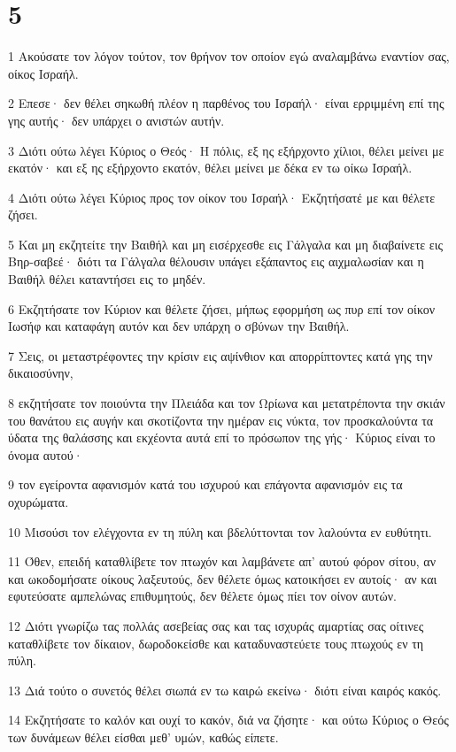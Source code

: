 \chapter{5}

\par 1 Ακούσατε τον λόγον τούτον, τον θρήνον τον οποίον εγώ αναλαμβάνω εναντίον σας, οίκος Ισραήλ.
\par 2 Επεσε· δεν θέλει σηκωθή πλέον η παρθένος του Ισραήλ· είναι ερριμμένη επί της γης αυτής· δεν υπάρχει ο ανιστών αυτήν.
\par 3 Διότι ούτω λέγει Κύριος ο Θεός· Η πόλις, εξ ης εξήρχοντο χίλιοι, θέλει μείνει με εκατόν· και εξ ης εξήρχοντο εκατόν, θέλει μείνει με δέκα εν τω οίκω Ισραήλ.
\par 4 Διότι ούτω λέγει Κύριος προς τον οίκον του Ισραήλ· Εκζητήσατέ με και θέλετε ζήσει.
\par 5 Και μη εκζητείτε την Βαιθήλ και μη εισέρχεσθε εις Γάλγαλα και μη διαβαίνετε εις Βηρ-σαβεέ· διότι τα Γάλγαλα θέλουσιν υπάγει εξάπαντος εις αιχμαλωσίαν και η Βαιθήλ θέλει καταντήσει εις το μηδέν.
\par 6 Εκζητήσατε τον Κύριον και θέλετε ζήσει, μήπως εφορμήση ως πυρ επί τον οίκον Ιωσήφ και καταφάγη αυτόν και δεν υπάρχη ο σβύνων την Βαιθήλ.
\par 7 Σεις, οι μεταστρέφοντες την κρίσιν εις αψίνθιον και απορρίπτοντες κατά γης την δικαιοσύνην,
\par 8 εκζητήσατε τον ποιούντα την Πλειάδα και τον Ωρίωνα και μετατρέποντα την σκιάν του θανάτου εις αυγήν και σκοτίζοντα την ημέραν εις νύκτα, τον προσκαλούντα τα ύδατα της θαλάσσης και εκχέοντα αυτά επί το πρόσωπον της γής· Κύριος είναι το όνομα αυτού·
\par 9 τον εγείροντα αφανισμόν κατά του ισχυρού και επάγοντα αφανισμόν εις τα οχυρώματα.
\par 10 Μισούσι τον ελέγχοντα εν τη πύλη και βδελύττονται τον λαλούντα εν ευθύτητι.
\par 11 Όθεν, επειδή καταθλίβετε τον πτωχόν και λαμβάνετε απ' αυτού φόρον σίτου, αν και ωκοδομήσατε οίκους λαξευτούς, δεν θέλετε όμως κατοικήσει εν αυτοίς· αν και εφυτεύσατε αμπελώνας επιθυμητούς, δεν θέλετε όμως πίει τον οίνον αυτών.
\par 12 Διότι γνωρίζω τας πολλάς ασεβείας σας και τας ισχυράς αμαρτίας σας οίτινες καταθλίβετε τον δίκαιον, δωροδοκείσθε και καταδυναστεύετε τους πτωχούς εν τη πύλη.
\par 13 Διά τούτο ο συνετός θέλει σιωπά εν τω καιρώ εκείνω· διότι είναι καιρός κακός.
\par 14 Εκζητήσατε το καλόν και ουχί το κακόν, διά να ζήσητε· και ούτω Κύριος ο Θεός των δυνάμεων θέλει είσθαι μεθ' υμών, καθώς είπετε.
